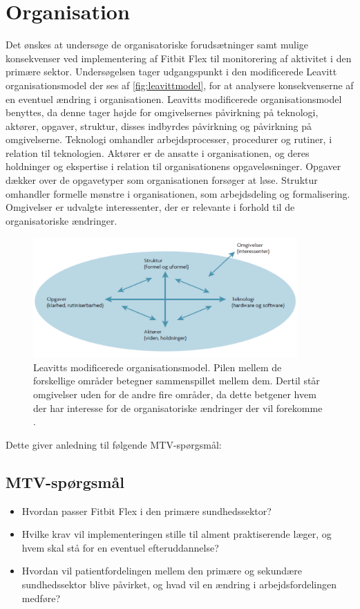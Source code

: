 \section{Organisation}\label{sec:metode_org}
Det ønskes at undersøge de organisatoriske forudsætninger samt mulige konsekvenser ved implementering af Fitbit Flex til monitorering af aktivitet i den primære sektor. Undersøgelsen tager udgangspunkt i den modificerede Leavitt organisationsmodel der ses af \autoref{fig:leavittmodel}, for at analysere konsekvenserne af en eventuel ændring i organisationen. Leavitts modificerede organisationsmodel benyttes, da denne tager højde for omgivelsernes påvirkning på teknologi, aktører, opgaver, struktur, disses indbyrdes påvirkning og påvirkning på omgivelserne. 
Teknologi omhandler arbejdsprocesser, procedurer og rutiner, i relation til teknologien.  
Aktører er de ansatte i organisationen, og deres holdninger og ekspertise i relation til organisationens opgaveløsninger. 
Opgaver dækker over de opgavetyper som organisationen forsøger at løse. 
Struktur omhandler formelle mønstre i organisationen, som arbejdsdeling og formalisering.  
Omgivelser er udvalgte interessenter, der er relevante i forhold til de organisatoriske ændringer. 

\begin{figure}[H]
\centering
\includegraphics[width=0.9\textwidth]{figures/leavitt}
\caption{Leavitts modificerede organisationsmodel. Pilen mellem de forskellige områder betegner sammenspillet mellem dem. Dertil står omgivelser uden for de andre fire områder, da dette betgener hvem der har interesse for de organisatoriske ændringer der vil forekomme \citep{mtvhaandbog}.}
\label{fig:leavittmodel}
\end{figure}
\noindent
Dette giver anledning til følgende MTV-spørgsmål:

\subsection{MTV-spørgsmål}
\begin{itemize}
\item Hvordan passer Fitbit Flex i den primære sundhedssektor? 
\item Hvilke krav vil implementeringen stille til alment praktiserende læger, og hvem skal stå for en eventuel efteruddannelse? 
\item  Hvordan vil patientfordelingen mellem den primære og sekundære sundhedssektor blive påvirket, og hvad vil en ændring i arbejdsfordelingen medføre?
\end{itemize}

